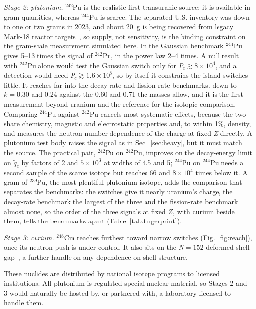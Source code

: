 \documentclass[aps,prd,onecolumn,superscriptaddress,floatfix,nofootinbib]{revtex4-2}
\newcommand{\qt}{\tilde q}
\newcommand{\Pu}[1]{$^{#1}$Pu}
\newcommand{\nuc}[2]{$^{#1}$#2}
\begin{document}
\textit{Stage 2: plutonium.} \Pu{242} is the realistic first transuranic source: it is available in gram quantities,
whereas \Pu{244} is scarce. The separated U.S. inventory was down to one or two grams in 2023, and about 20~g is
being recovered from legacy Mark-18 reactor targets~\cite{SRNL2023}, so supply, not sensitivity, is the binding
constraint on the gram-scale measurement simulated here. In the
Gaussian benchmark \Pu{244} gives 5--13 times the signal of \Pu{242}, in the power law 2--4 times. A null result
with \Pu{242} alone would test the Gaussian switch only for $P_c\gtrsim8\times10^{4}$, and a detection would need
$P_c\gtrsim1.6\times10^{8}$, so by itself it constrains the island switches little. It reaches far into the decay-rate
and fission-rate benchmarks, down to $k=0.30$ and 0.24 against the 0.60 and 0.71 the masses allow, and it is the first
measurement beyond uranium and the reference for the isotopic comparison. Comparing \Pu{244} against \Pu{242} cancels most systematic
effects, because the two share chemistry, magnetic and electrostatic properties and, to within 1\%, density, and
measures the neutron-number dependence of the charge at fixed $Z$ directly. A plutonium test body raises the
signal as in Sec.~\ref{sec:heavy}, but it must match the source. The practical pair, \Pu{242} on \Pu{242}, improves
on the decay-energy limit on $\qt_c$ by factors of 2 and $5\times10^{3}$ at widths of 4.5 and 5; \Pu{244} on
\Pu{244} needs a second sample of the scarce isotope but reaches 66 and $8\times10^{4}$ times below it. A gram of
\Pu{239}, the most plentiful plutonium isotope, adds the comparison that separates the benchmarks: the switches give
it nearly uranium's charge, the decay-rate benchmark the largest of the three and the fission-rate benchmark almost
none, so the order of the three signals at fixed $Z$, with curium beside them, tells the benchmarks apart
(Table~\ref{tab:fingerprint}).

\textit{Stage 3: curium.} \nuc{248}{Cm} reaches furthest toward narrow switches (Fig.~\ref{fig:reach}), once its
neutron push is under control. It also sits on the $N=152$ deformed shell gap~\cite{Ackermann2017}, a further handle
on any dependence on shell structure.

These nuclides are distributed by national isotope programs to licensed institutions. All plutonium is regulated
special nuclear material, so Stages 2 and 3 would naturally be hosted by, or partnered with, a laboratory licensed to
handle them.

\FloatBarrier
\end{document}
